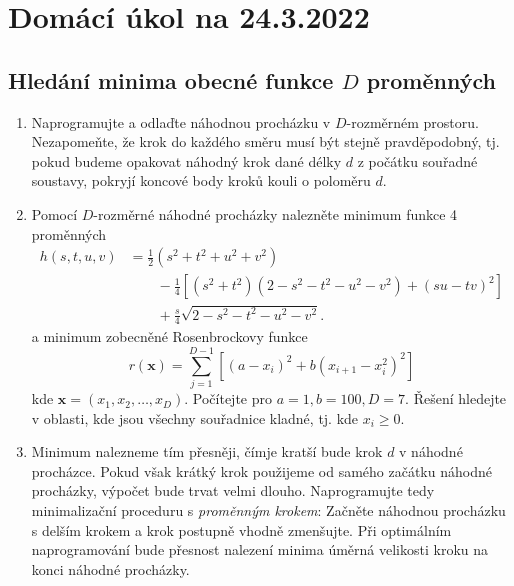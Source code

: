 \documentclass[a4paper,11pt,twoside]{article}
\def\vector#1{\boldsymbol{#1}}								%
\begin{document}
\section*{Domácí úkol na 24.3.2022}
\subsection*{Hledání minima obecné funkce $D$ proměnných}
\begin{enumerate}
    \item Naprogramujte a odlaďte náhodnou procházku v $D$-rozměrném prostoru.
        Nezapomeňte, že krok do každého směru musí být stejně pravděpodobný, tj. pokud budeme opakovat náhodný krok dané délky $d$ z počátku souřadné soustavy, pokryjí koncové body kroků kouli o poloměru $d$.

    \item Pomocí $D$-rozměrné náhodné procházky nalezněte minimum funkce 4 proměnných
        \begin{align*}
            h(s,t,u,v)&=\frac{1}{2}\left(s^2+t^2+u^2+v^2\right)\\
                &\qquad-\frac{1}{4}\left[\left(s^2+t^2\right)\left(2-s^2-t^2-u^2-v^2\right)+\left(su-tv\right)^2\right]\\
                &\qquad+\frac{s}{4}\sqrt{2-s^2-t^2-u^2-v^2}.
        \end{align*}
        a minimum zobecněné Rosenbrockovy funkce
        \begin{equation*}
            r(\vector{x})=\sum_{j=1}^{D-1}\left[\left(a-x_{i}\right)^{2}+b\left(x_{i+1}-x_{i}^{2}\right)^2\right]
        \end{equation*}
        kde $\vector{x}=(x_1,x_2,\dotsc,x_D)$. Počítejte pro $a=1, b=100, D=7$.
        Řešení hledejte v oblasti, kde jsou všechny souřadnice kladné, tj. kde $x_{i}\geq0$.

    \item Minimum nalezneme tím přesněji, čímje kratší bude krok $d$ v náhodné procházce.
        Pokud však krátký krok použijeme od samého začátku náhodné procházky, výpočet bude trvat velmi dlouho.
        Naprogramujte tedy minimalizační proceduru s \emph{proměnným krokem}: Začněte náhodnou procházku s delším krokem a krok postupně vhodně zmenšujte.
        Při optimálním naprogramování bude přesnost nalezení minima úměrná velikosti kroku na konci náhodné procházky.
\end{enumerate}
\end{document}
